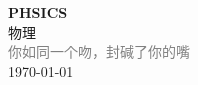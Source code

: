 \vspace*{\fill}
\begin{center}
    \textcolor{purple!50}{\Huge\textbf{PHSICS}} \\[1em]
    \textcolor{purple!60!pink}{\Large 物理} \\[2em]
    \textcolor{gray}{\large 你如同一个吻，封碱了你的嘴} \\[1em]
    \today
\end{center}
\vspace*{\fill}
\clearpage


\clearpage

\clearpage
